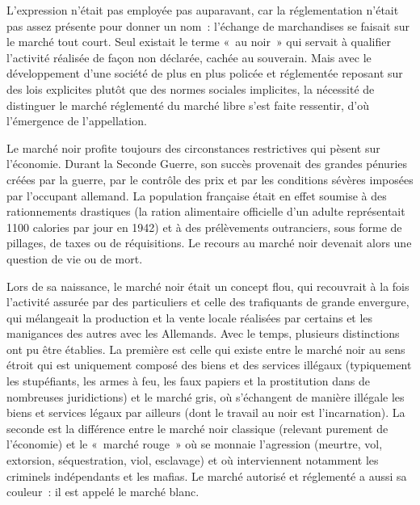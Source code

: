 L'expression n'était pas employée pas auparavant, car la réglementation n'était pas assez présente pour donner un nom~: l'échange de marchandises se faisait sur le marché tout court. Seul existait le terme «~au noir~» qui servait à qualifier l'activité réalisée de façon non déclarée, cachée au souverain. Mais avec le développement d'une société de plus en plus policée et réglementée reposant sur des lois explicites plutôt que des normes sociales implicites, la nécessité de distinguer le marché réglementé du marché libre s'est faite ressentir, d'où l'émergence de l'appellation. 

Le marché noir profite toujours des circonstances restrictives qui pèsent sur l'économie. Durant la Seconde Guerre, son succès provenait des grandes pénuries créées par la guerre, par le contrôle des prix et par les conditions sévères imposées par l'occupant allemand. La population française était en effet soumise à des rationnements drastiques (la ration alimentaire officielle d'un adulte représentait 1100 calories par jour en 1942) et à des prélèvements outranciers, sous forme de pillages, de taxes ou de réquisitions. Le recours au marché noir devenait alors une question de vie ou de mort.

Lors de sa naissance, le marché noir était un concept flou, qui recouvrait à la fois l'activité assurée par des particuliers et celle des trafiquants de grande envergure, qui mélangeait la production et la vente locale réalisées par certains et les manigances des autres avec les Allemands. Avec le temps, plusieurs distinctions ont pu être établies. La première est celle qui existe entre le marché noir au sens étroit qui est uniquement composé des biens et des services illégaux (typiquement les stupéfiants, les armes à feu, les faux papiers et la prostitution dans de nombreuses juridictions) et le marché gris, où s'échangent de manière illégale les biens et services légaux par ailleurs (dont le travail au noir est l'incarnation). La seconde est la différence entre le marché noir classique (relevant purement de l'économie) et le «~marché rouge~» où se monnaie l'agression (meurtre, vol, extorsion, séquestration, viol, esclavage) et où interviennent notamment les criminels indépendants et les mafias. Le marché autorisé et réglementé a aussi sa couleur~: il est appelé le marché blanc.

